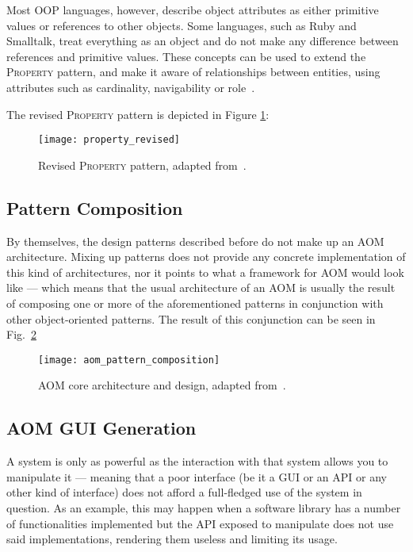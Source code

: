 Most OOP languages, however, describe object attributes as either primitive values or references to other objects. Some languages, such as Ruby and Smalltalk, treat everything as an object and do not make any difference between references and primitive values. These concepts can be used to extend the \textsc{Property} pattern, and make it aware of relationships between entities, using attributes such as cardinality, navigability or role~\cite{aom_research_roadmap}.

The revised \textsc{Property} pattern is depicted in Figure \ref{fig:property_revised}:

\begin{figure}[H]
  \centering
  \texttt{[image: property\_revised]}
  \caption{Revised \textsc{Property} pattern, adapted from~\cite{aom_research_roadmap}.}
  \label{fig:property_revised}
\end{figure}

\subsection{Pattern Composition}\label{sec:aom_pattern_composition}

By themselves, the design patterns described before do not make up an AOM architecture. Mixing up patterns does not provide any concrete implementation of this kind of architectures, nor it points to what a framework for AOM would look like --- which means that the usual architecture of an AOM is usually the result of composing one or more of the aforementioned patterns in conjunction with other object-oriented patterns. The result of this conjunction can be seen in Fig.~\ref{fig:aom_pattern_composition}

\begin{figure}[H]
  \centering
  \texttt{[image: aom\_pattern\_composition]}
  \caption{AOM core architecture and design, adapted from~\cite{YBJ01}.}
  \label{fig:aom_pattern_composition}
\end{figure}

\subsection{AOM GUI Generation}\label{sec:aom_gui_generation}

A system is only as powerful as the interaction with that system allows you to manipulate it --- meaning that a poor interface (be it a GUI or an API or any other kind of interface) does not afford a full-fledged use of the system in question. As an example, this may happen when a software library has a number of functionalities implemented but the API exposed to manipulate does not use said implementations, rendering them useless and limiting its usage.

